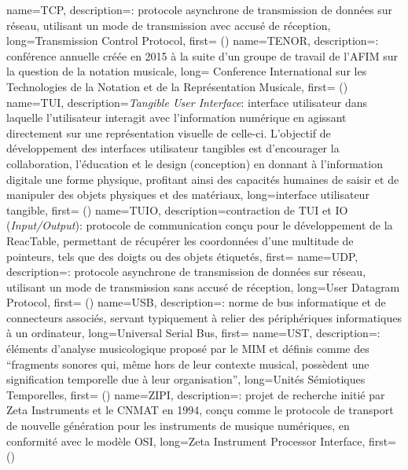 {
    name={TCP},
    description={\textit{}: protocole asynchrone de transmission de données sur réseau, utilisant un mode de transmission avec accusé de réception},
    long={Transmission Control Protocol},
    first={ ()}
}
{
    name={TENOR},
    description={\textit{}: conférence annuelle créée en 2015 à la suite d'un groupe de travail de l'\gls{AFIM} sur la question de la notation musicale},
    long= {Conference International sur les Technologies de la Notation et de la Représentation Musicale},
    first={ ()}
}
{
    name={TUI},
    description={\textit{Tangible User Interface}: interface utilisateur dans laquelle l'utilisateur interagit avec l'information numérique en agissant directement sur une représentation visuelle de celle-ci. L'objectif de développement des interfaces utilisateur tangibles est d'encourager la collaboration, l'éducation et le design (conception) en donnant à l'information digitale une forme physique, profitant ainsi des capacités humaines de saisir et de manipuler des objets physiques et des matériaux},
    long={interface utilisateur tangible},
    first={ ()}
}
{
    name={TUIO},
    description={contraction de \gls{TUI} et IO (\textit{Input/Output}): protocole de communication conçu pour le développement de la ReacTable, permettant de récupérer les coordonnées d'une multitude de pointeurs, tels que des doigts ou des objets étiquetés},
    first={}
}
{
    name={UDP},
    description={\textit{}: protocole asynchrone de transmission de données sur réseau, utilisant un mode de transmission sans accusé de réception},
    long={User Datagram Protocol},
    first={ ()}
}
{
    name={USB},
    description={\textit{}: norme de bus informatique et de connecteurs associés, servant typiquement à relier des périphériques informatiques à un ordinateur},
    long={Universal Serial Bus},
    first={}
}
{
    name={UST},
    description={\textit{}: éléments d'analyse musicologique proposé par le \gls{MIM} et définis comme des ``fragments sonores qui, même hors de leur contexte musical, possèdent une signification temporelle due à leur organisation''},
    long={Unités Sémiotiques Temporelles},
    first={ ()}
}
{
    name={ZIPI},
    description={\textit{}: projet de recherche initié par Zeta Instruments et le \gls{CNMAT} en 1994, conçu comme le protocole de transport de nouvelle génération pour les instruments de musique numériques, en conformité avec le modèle \gls{OSI}},
    long={Zeta Instrument Processor Interface},
    first={ ()}
}


%
